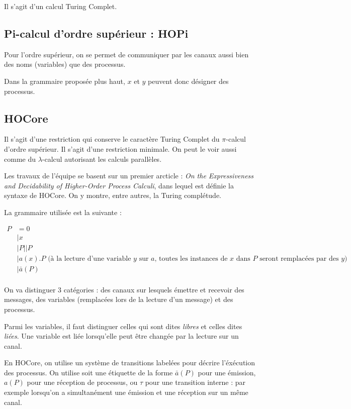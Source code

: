 \documentclass{article}
\def\pic{$\pi$-calcul }
\begin{document}
Il s'agit d'un calcul Turing Complet.

\subsection{Pi-calcul d'ordre supérieur : HOPi}
Pour l'ordre supérieur, on se permet de communiquer par les canaux aussi bien des noms (variables) que des processus.

Dans la grammaire proposée plus haut, $x$ et $y$ peuvent donc désigner des processus.

\subsection{HOCore}
Il s'agit d'une restriction qui conserve le caractère Turing Complet du \pic d'ordre supérieur. Il s'agit d'une restriction minimale. On peut le voir aussi comme du $\lambda$-calcul autorisant les calculs parallèles.

Les travaux de l'équipe se basent sur un premier arcticle : \textit{On the Expressiveness and Decidability of Higher-Order Process Calculi}, dans lequel est définie la syntaxe de HOCore. On y montre, entre autres, la Turing complétude.

La grammaire utilisée est la suivante :

\begin{align*}
P &= 0 \\
&| x \\
&| P||P\\
&| a(x).P \text{ (à la lecture d'une variable $y$ sur $a$, toutes les instances de $x$ dans $P$ seront remplacées par des $y$)}\\
&| \bar{a}(P) \\
\end{align*}

On va distinguer 3 catégories : des canaux sur lesquels émettre et recevoir des messages, des variables (remplacées lors de la lecture d'un message) et des processus.

Parmi les variables, il faut distinguer celles qui sont dites \textit{libres} et celles dites \textit{liées}.
Une variable est liée lorsqu'elle peut être changée par la lecture sur un canal. 

En HOCore, on utilise un système de transitions labelées pour décrire l'éxécution des processus. On utilise soit une étiquette de la forme $\bar{a}(P)$ pour une émission, $a(P)$ pour une réception de processus, ou $\tau$ pour une transition interne : par exemple lorsqu'on a simultanément une émission et une réception sur un même canal.
\end{document}

